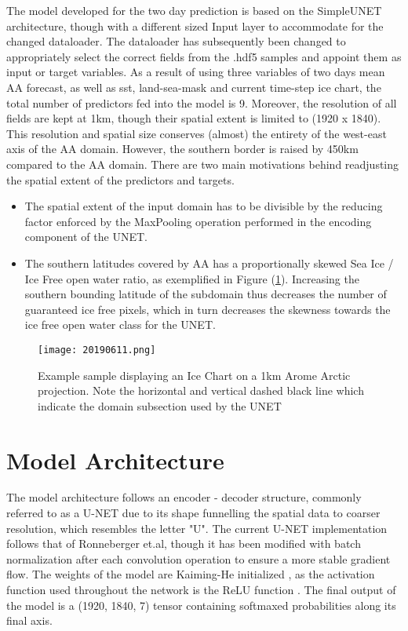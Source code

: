 \documentclass[../main/thesis]{subfiles}
\begin{document}
The model developed for the two day prediction is based on the SimpleUNET architecture, though with a different sized Input layer to accommodate for the changed dataloader. The dataloader has subsequently been changed to appropriately select the correct fields from the .hdf5 samples and appoint them as input or target variables. As a result of using three variables of two days mean AA forecast, as well as sst, land-sea-mask and current time-step ice chart, the total number of predictors fed into the model is 9. Moreover, the resolution of all fields are kept at 1km, though their spatial extent is limited to (1920 x 1840). This resolution and spatial size conserves (almost) the entirety of the west-east axis of the AA domain. However, the southern border is raised by 450km compared to the AA domain. There are two main motivations behind readjusting the spatial extent of the predictors and targets.

\begin{itemize}
    \item[1.] The spatial extent of the input domain has to be divisible by the reducing factor enforced by the MaxPooling operation performed in the encoding component of the UNET.
    \item[2.] The southern latitudes covered by AA has a proportionally skewed Sea Ice / Ice Free open water ratio, as exemplified in Figure (\ref{fig:exampleAAsouthborder}). Increasing the southern bounding latitude of the subdomain thus decreases the number of guaranteed ice free pixels, which in turn decreases the skewness towards the ice free open water class for the UNET.
\end{itemize}

\begin{figure}
    \texttt{[image: 20190611.png]}
    \caption{\label{fig:exampleAAsouthborder}Example sample displaying an Ice Chart on a 1km Arome Arctic projection. Note the horizontal and vertical dashed black line which indicate the domain subsection used by the UNET}
\end{figure}

\section{Model Architecture}
The model architecture follows an encoder - decoder structure, commonly referred to as a U-NET \cite{Ronneberger2015} due to its shape funnelling the spatial data to coarser resolution, which resembles the letter "U". The current U-NET implementation follows that of Ronneberger et.al, though it has been modified with batch normalization after each convolution operation to ensure a more stable gradient flow. The weights of the model are Kaiming-He initialized \cite{He2015}, as the activation function used throughout the network is the ReLU function \cite{Nair2010}. The final output of the model is a (1920, 1840, 7) tensor containing softmaxed probabilities along its final axis.
\end{document}
